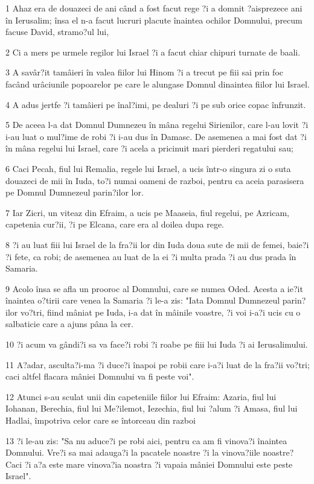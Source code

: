 \par 1 Ahaz era de douazeci de ani când a fost facut rege ?i a domnit ?aisprezece ani în Ierusalim; însa el n-a facut lucruri placute înaintea ochilor Domnului, precum facuse David, stramo?ul lui,
\par 2 Ci a mers pe urmele regilor lui Israel ?i a facut chiar chipuri turnate de baali.
\par 3 A savâr?it tamâieri în valea fiilor lui Hinom ?i a trecut pe fiii sai prin foc facând urâciunile popoarelor pe care le alungase Domnul dinaintea fiilor lui Israel.
\par 4 A adus jertfe ?i tamâieri pe înal?imi, pe dealuri ?i pe sub orice copac înfrunzit.
\par 5 De aceea l-a dat Domnul Dumnezeu în mâna regelui Sirienilor, care l-au lovit ?i i-au luat o mul?ime de robi ?i i-au dus în Damasc. De asemenea a mai fost dat ?i în mâna regelui lui Israel, care ?i acela a pricinuit mari pierderi regatului sau;
\par 6 Caci Pecah, fiul lui Remalia, regele lui Israel, a ucis într-o singura zi o suta douazeci de mii în Iuda, to?i numai oameni de razboi, pentru ca aceia parasisera pe Domnul Dumnezeul parin?ilor lor.
\par 7 Iar Zicri, un viteaz din Efraim, a ucis pe Maaseia, fiul regelui, pe Azricam, capetenia cur?ii, ?i pe Elcana, care era al doilea dupa rege.
\par 8 ?i au luat fiii lui Israel de la fra?ii lor din Iuda doua sute de mii de femei, baie?i ?i fete, ca robi; de asemenea au luat de la ei ?i multa prada ?i au dus prada în Samaria.
\par 9 Acolo însa se afla un prooroc al Domnului, care se numea Oded. Acesta a ie?it înaintea o?tirii care venea la Samaria ?i le-a zis: "Iata Domnul Dumnezeul parin?ilor vo?tri, fiind mâniat pe Iuda, i-a dat în mâinile voastre, ?i voi i-a?i ucis cu o salbaticie care a ajuns pâna la cer.
\par 10 ?i acum va gândi?i sa va face?i robi ?i roabe pe fiii lui Iuda ?i ai Ierusalimului.
\par 11 A?adar, asculta?i-ma ?i duce?i înapoi pe robii care i-a?i luat de la fra?ii vo?tri; caci altfel flacara mâniei Domnului va fi peste voi".
\par 12 Atunci s-au sculat unii din capeteniile fiilor lui Efraim: Azaria, fiul lui Iohanan, Berechia, fiul lui Me?ilemot, Iezechia, fiul lui ?alum ?i Amasa, fiul lui Hadlai, împotriva celor care se întorceau din razboi
\par 13 ?i le-au zis: "Sa nu aduce?i pe robi aici, pentru ca am fi vinova?i înaintea Domnului. Vre?i sa mai adauga?i la pacatele noastre ?i la vinova?iile noastre? Caci ?i a?a este mare vinova?ia noastra ?i vapaia mâniei Domnului este peste Israel".

